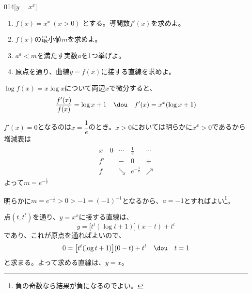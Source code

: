 \begin{prob}{014}{}{[$y=x^x$]}
 \begin{enumerate}
  \item $f(x)=x^x~(x>0)$ とする。導関数$f'(x)$を求めよ。
  \item $f(x)$の最小値$m$を求めよ。
  \item $a^a < m$を満たす実数$a$を1つ挙げよ。
  \item 原点を通り、曲線$y=f(x)$に接する直線を求めよ。
 \end{enumerate}
\end{prob}

$\log f(x)=x\log x$について両辺$x$で微分すると、
\[ \frac{f'(x)}{f(x)}=\log x+1 \quad\dou\quad f'(x)=x^x(\log x+1) \]

$f'(x)=0$となるのは$x=\dfrac{1}{e}$のとき。$x>0$においては明らかに$x^x>0$であるから増減表は
\begin{align*}
\begin{array}{c|c|c|c|c}
 x & 0 & \cdots & \frac{1}{e} & \cdots \\ \hline\hline
 f' & & - & 0 & + \\ \hline
 f & & \searrow & e^{-\frac{1}{e}} & \nearrow
\end{array}
\end{align*}
よって$m=e^{-\frac{1}{e}}$

明らかに$m=e^{-\frac{1}{e}}>0>-1=(-1)^{-1}$となるから、$a=-1$とすればよい\footnote{負の奇数なら結果が負になるのでよい。}。

点$(t,t^t)$を通り、$y=x^x$に接する直線は、
\[ y=\bigl[t^t(\log t+1)\bigr](x-t)+t^t \]
であり、これが原点を通ればよいので、
\[ 0=\bigl[t^t(\log t+1)\bigr](0-t)+t^t \quad\dou\quad t=1 \]
と求まる。よって求める直線は、$y=x$。